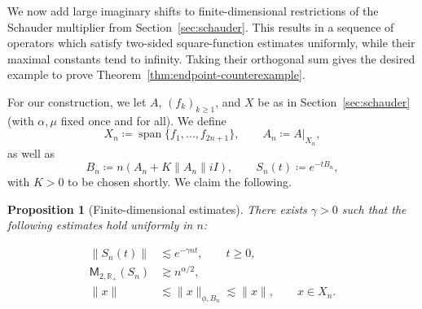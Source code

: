 \documentclass[11pt]{amsart}
\newtheorem{proposition}[theorem]{Proposition}
\theoremstyle{definition}
\theoremstyle{remark}
\numberwithin{equation}{section}
\newcommand{\R}{\mathbb R}
\newcommand{\1}{\mathbf 1}
\newcommand{\cM}{\mathsf{M}}
\newcommand{\norm}[1]{\lVert #1\rVert}
\newcommand{\spn}{\operatorname{span}}
\begin{document}
We now add large imaginary shifts to finite-dimensional restrictions of the
Schauder multiplier from Section~\ref{sec:schauder}. 
This results in a sequence of operators which satisfy two-sided square-function estimates uniformly, while their maximal constants tend to infinity.
Taking their orthogonal sum gives the desired example to prove Theorem~\ref{thm:endpoint-counterexample}.

For our construction, we let $A$, $(f_k)_{k \geq 1}$, and $X$ be as in Section~\ref{sec:schauder} (with $\alpha, \mu$ fixed once and for all). We define
\[
 X_n \coloneq \spn\{f_1,\ldots,f_{2n+1}\}, \qquad A_n \coloneq A|_{X_n},
\]
as well as
\[
B_n \coloneq n(A_n+ K \norm{A_n} i I), \qquad S_n(t) \coloneq e^{-tB_n},
\]
with $K > 0$ to be chosen shortly.
We claim the following.

\begin{proposition}[Finite-dimensional estimates]
\label{prop:endpoint-blocks}
There exists $\gamma > 0$ such that the following estimates hold uniformly in $n$:

\begin{align}
    \label{eq:Snexpstab}
 \norm{S_n(t)}&\lesssim e^{-\gamma n t}, \qquad t\ge0, \\
    \label{eq:SnMblowup}
  \cM_{2,\R_+}(S_n) &\gtrsim n^{\alpha/2}, \\
  \label{eq:squarefunctionbound}
\norm{x} &\lesssim \norm{x}_{\phi,B_n} \lesssim \norm{x}, \qquad x\in X_n.
\end{align}
\end{proposition}
\end{document}
